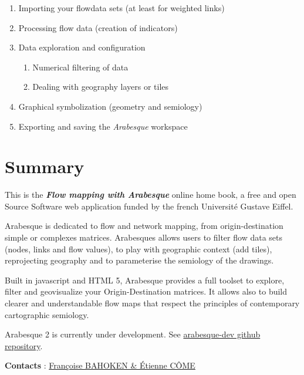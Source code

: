 \documentclass[
  letterpaper,
  DIV=11,
  numbers=noendperiod]{scrreprt}
\providecommand{\tightlist}{%
  \setlength{\itemsep}{0pt}\setlength{\parskip}{0pt}}\usepackage{longtable,booktabs,array}
\begin{document}
\begin{enumerate}
\def\labelenumi{\arabic{enumi}.}
\tightlist
\item
  Importing your flowdata sets (at least for weighted links)
\item
  Processing flow data (creation of indicators)
\item
  Data exploration and configuration

  \begin{enumerate}
  \def\labelenumii{\arabic{enumii}.}
  \tightlist
  \item
    Numerical filtering of data
  \item
    Dealing with geography layers or tiles
  \end{enumerate}
\item
  Graphical symbolization (geometry and semiology)
\item
  Exporting and saving the \emph{Arabesque} workspace
\end{enumerate}


\chapter{Summary}\label{summary}

This is the \textbf{\emph{Flow mapping with Arabesque}} online home
book, a free and open Source Software web application funded by the
french Université Gustave Eiffel.

Arabesque is dedicated to flow and network mapping, from
origin-destination simple or complexes matrices. Arabesques allows users
to filter flow data sets (nodes, links and flow values), to play with
geographic context (add tiles), reprojecting geography and to
parameterise the semiology of the drawings.

Built in javascript and HTML 5, Arabesque provides a full toolset to
explore, filter and geovisualize your Origin-Destination matrices. It
allows also to build clearer and understandable flow maps that respect
the principles of contemporary cartographic semiology.

Arabesque 2 is currently under development. See
\href{https://github.com/gflowiz/arabesque-dev}{arabesque-dev github
repository}.

\textbf{Contacts} :
\href{mailto:francoise.bahoken@univ-eiffel.fr,etienne.come@univ-eiffel.fr}{Françoise
BAHOKEN \& Étienne CÔME}

\end{document}
